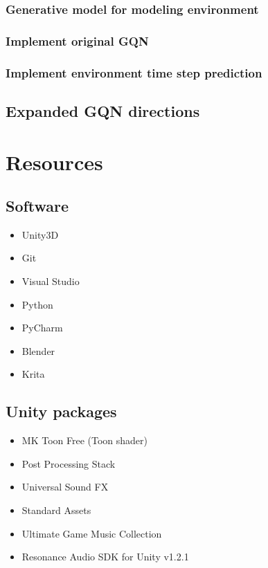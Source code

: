 \documentclass[a4paper, twoside, 10pt]{report}
\begin{document}
{\subsection{Generative model for modeling environment}
\subsection{Implement original GQN}
\subsection{Implement environment time step prediction}
\section{Expanded GQN directions}



\chapter{Resources}
\section{Software}
\begin{itemize}
\item Unity3D
\item Git
\item Visual Studio
\item Python
\item PyCharm
\item Blender
\item Krita
\end{itemize}

\section{Unity packages}
\begin{itemize}
\item MK Toon Free (Toon shader) %
\item Post Processing Stack %
\item Universal Sound FX %
\item Standard Assets %
\item Ultimate Game Music Collection %
\item Resonance Audio SDK for Unity v1.2.1 %
\end{itemize}

}
\end{document}
